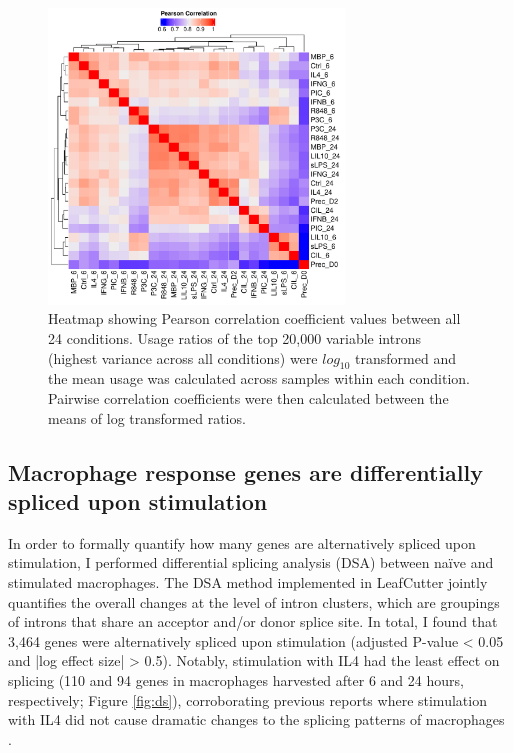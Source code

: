 \begin{figure}[H]
  \centering
  \includegraphics[width=0.7\textwidth]{cond_corr}
  \caption[Correlation heatmap of intron usage ratios]{Heatmap showing Pearson correlation coefficient values between all 24 conditions. Usage ratios of the top 20,000 variable introns (highest variance across all conditions) were $log_{10}$ transformed and the mean usage was calculated across samples within each condition. Pairwise correlation coefficients were then calculated between the means of log transformed ratios.}
  \label{fig:cond_corr}   
\end{figure}

\subsection{Macrophage response genes are differentially spliced upon stimulation}
In order to formally quantify how many genes are alternatively spliced upon stimulation, I performed differential splicing analysis (DSA) between naïve and stimulated macrophages. The DSA method implemented in LeafCutter jointly quantifies the overall changes at the level of intron clusters, which are groupings of introns that share an acceptor and/or donor splice site. In total, I found that 3,464 genes were alternatively spliced upon stimulation (adjusted P-value < 0.05 and |log effect size| > 0.5). Notably, stimulation with IL4 had the least effect on splicing (110 and 94 genes in macrophages harvested after 6 and 24 hours, respectively; Figure \ref{fig:ds}), corroborating previous reports where stimulation with IL4 did not cause dramatic changes to the splicing patterns of macrophages \cite{Liu2018-fh}. \\

